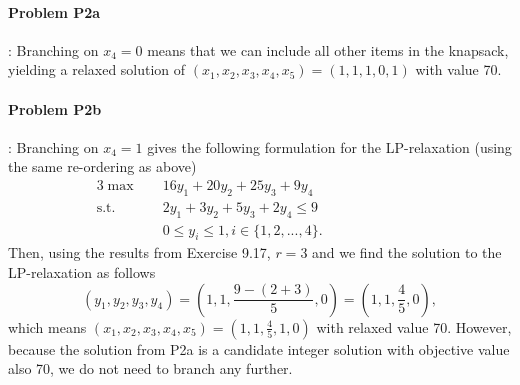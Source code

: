 \documentclass[10pt]{article}
\begin{document}
\begin{enumerate}
\paragraph{Problem P2a}: Branching on $x_4=0$ means that we can include
all other items in the knapsack, yielding a relaxed solution of
$(x_1,x_2,x_3,x_4,x_5)=(1,1,1,0,1)$ with value 70.   


\paragraph{Problem P2b}: Branching on $x_4=1$ gives the following formulation for the LP-relaxation (using the same re-ordering as above)
\begin{alignat}{3}
\max \quad & 16y_1 +20y_2 +25y_3 + 9 y_4 \nonumber \\ 
\mbox{s.t.} \quad & 2 y_1 + 3 y_2 + 5 y_3 + 2 y_4  \le 9 &\qquad&   &\qquad&  \nonumber \\
& 0\le y_i \le 1, i\in \{1,2,...,4\}. \nonumber
\end{alignat}
Then, using the results from Exercise 9.17, $r=3$ and we find the solution to the LP-relaxation as follows
\begin{equation}
(y_1,y_2,y_3,y_4) = \left(1,1,\frac{9-(2+3)}{5},0 \right) = (1,1,\frac{4}{5},0), \nonumber
\end{equation}
which means $(x_1,x_2,x_3,x_4,x_5) = (1,1,\frac{4}{5},1,0)$ with
relaxed value 70.  However, because the solution from P2a is a
candidate integer solution with objective value also 70, we do not need to
branch any further.


\begin{center}
\end{center}

\end{enumerate}
  
\end{document}
